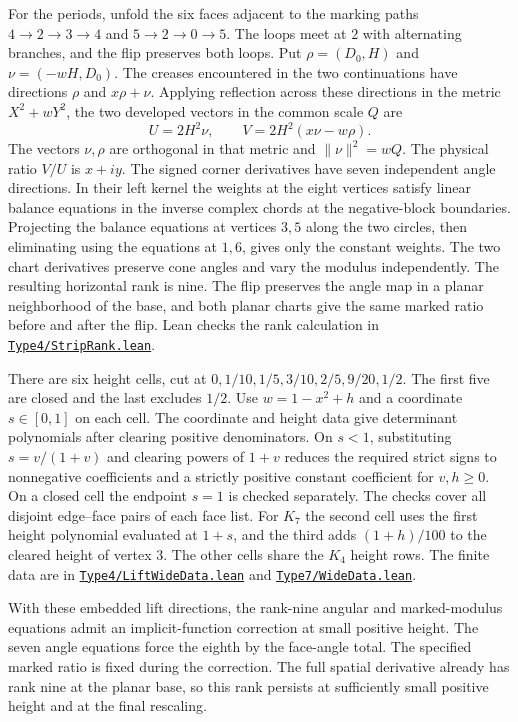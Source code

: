 \documentclass[11pt,letterpaper]{amsart}
\newcommand{\release}{bd3a0e03908481d738df30233cf95c641a1d3f71}
\newcommand{\src}[2]{\href{https://github.com/vltanh/lean4-origami-torus/blob/\release/#1}{\texttt{#2}}}
\begin{document}
For the periods, unfold the six faces adjacent to the marking
paths \(4\to2\to3\to4\) and \(5\to2\to0\to5\). The loops meet at
\(2\) with alternating branches, and the flip preserves both
loops. Put \(\rho=(D_0,H)\) and \(\nu=(-wH,D_0)\).
The creases encountered in the two continuations have directions
\(\rho\) and \(x\rho+\nu\). Applying reflection across these
directions in the metric \(X^2+wY^2\), the two developed vectors
in the common scale \(Q\) are
\[
 U=2H^2\nu,\qquad V=2H^2(x\nu-w\rho).
\]
The vectors \(\nu,\rho\) are orthogonal in that metric and
\(\|\nu\|^2=wQ\). The physical ratio \(V/U\) is \(x+iy\).
The signed corner derivatives have seven independent angle
directions. In their left kernel the weights at the eight
vertices satisfy linear balance equations in the inverse complex
chords at the negative-block boundaries. Projecting the balance
equations at vertices \(3,5\) along the two circles, then
eliminating using the equations at \(1,6\), gives only the
constant weights. The two chart derivatives preserve cone angles
and vary the modulus independently. The resulting horizontal rank
is nine. The flip preserves the angle map in a planar
neighborhood of the base, and both planar charts give the same
marked ratio before and after the flip. Lean checks the rank
calculation in \src{OrigamiTorus/EightVertex/Type4/StripRank.lean}{Type4/StripRank.lean}.

There are six height cells, cut at \(0,1/10,1/5,3/10,2/5,9/20,1/2\).
The first five are closed and the last excludes \(1/2\).
Use \(w=1-x^2+h\) and a coordinate \(s\in[0,1]\) on each cell.
The coordinate and height data give determinant polynomials
after clearing positive denominators. On \(s<1\), substituting
\(s=v/(1+v)\) and clearing powers of \(1+v\) reduces the required
strict signs to nonnegative coefficients and a strictly positive
constant coefficient for \(v,h\ge0\). On a closed cell the
endpoint \(s=1\) is checked separately. The checks cover all
disjoint edge--face pairs of each face list. For \(K_7\) the second
cell uses the first height polynomial evaluated at \(1+s\),
and the third adds \((1+h)/100\) to the cleared height of vertex
\(3\). The other cells share the \(K_4\) height rows.
The finite data are in
\src{OrigamiTorus/EightVertex/Type4/LiftWideData.lean}{Type4/LiftWideData.lean}
and \src{OrigamiTorus/EightVertex/Type7/WideData.lean}{Type7/WideData.lean}.

With these embedded lift directions, the rank-nine angular and
marked-modulus equations admit an implicit-function correction at
small positive height. The seven angle equations force the
eighth by the face-angle total. The specified marked ratio is
fixed during the correction. The full spatial derivative already
has rank nine at the planar base, so this rank persists at
sufficiently small positive height and at the final rescaling.
\end{document}
